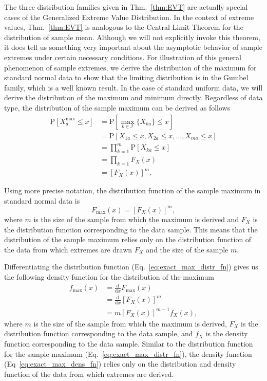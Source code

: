 \documentclass[aoas]{imsart}
\begin{document}
The three distribution families given in Thm.~\ref{thm:EVT} are actually special cases of the Generalized Extreme Value Distribution. In the context of extreme values, Thm.~\ref{thm:EVT} is analogous to the Central Limit Theorem for the distribution of sample mean.  Although we will not explicitly invoke this theorem, it does tell us something very important about the asymptotic behavior of sample extremes under certain necessary conditions. For illustration of this general phenomenon of sample extremes, we derive the distribution of the maximum for standard normal data to show that the limiting distribution is in the Gumbel family, which is a well known result. In the case of standard uniform data, we will derive the distribution of the maximum and minimum directly. Regardless of data type, the distribution of the sample maximum can be derived as follows
%
\begin{equation}\label{eq:exact_max}
\begin{aligned}
\text{P}[X^\text{max}_a \leq x] &= \text{P}\left[\max_{k \in \mathcal{I}}\{X_{ka}\} \leq x\right] \\
&= \text{P}[X_{1a} \leq x, X_{2a} \leq x, \dots, X_{ma} \leq x] \\
&= \prod_{k = 1}^{m} \text{P}[X_{ka} \leq x] \\
&= \prod_{k=1} F_X(x) \\
&= [F_X(x)]^m.
\end{aligned}
\end{equation}

Using more precise notation, the distribution function of the sample maximum in standard normal data is
%
\begin{equation}\label{eq:exact_max_distr_fn}
F_\text{max}(x) = [F_X(x)]^m,
\end{equation}
%
where $m$ is the size of the sample from which the maximum is derived and $F_X$ is the distribution function corresponding to the data sample. This means that the distribution of the sample maximum relies only on the distribution function of the data from which extremes are drawn $F_X$ and the size of the sample $m$.

Differentiating the distribution function (Eq.~\ref{eq:exact_max_distr_fn}) gives us the following density function for the distribution of the maximum
%
\begin{equation}\label{eq:exact_max_dens_fn}
\begin{aligned}
f_\text{max}(x) &= \frac{\text{d}}{\text{d}x} F_\text{max}(x) \\
&= \frac{\text{d}}{\text{d}x} [F_X(x)]^m \\
&= m [F_X(x)]^{m-1} f_X(x),
\end{aligned}
\end{equation}
%
where $m$ is the size of the sample from which the maximum is derived, $F_X$ is the distribution function corresponding to the data sample, and $f_X$ is the density function corresponding to the data sample. Similar to the distribution function for the sample maximum (Eq.~\ref{eq:exact_max_distr_fn}), the density function (Eq~\ref{eq:exact_max_dens_fn}) relies only on the distribution and density function of the data from which extremes are derived.
\end{document}
